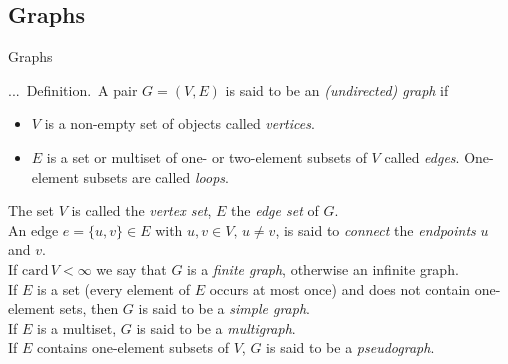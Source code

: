 \documentclass[smaller,hyperref={CJKbookmarks=true}]{beamer}
\newcounter{zhuo}[subsection]
\renewcommand{\thezhuo}{\thesection.\thesubsection.\arabic{zhuo}}
\newenvironment{DEFINITION}{\stepcounter{zhuo}\alert{\thezhuo.~Definition.\,}}{}
\begin{document}
\subsection{Graphs}
\begin{frame}[c] \begin{spacing}{2.5}
\tableofcontents[sectionstyle=hide,subsectionstyle=show/shaded/hide] \end{spacing}
\end{frame}
\begin{frame}[t]{Graphs}
\begin{spacing}{1.1}
\begin{DEFINITION}
A pair $G=(V,E)$ is said to be an \emph{(undirected) graph} if
\begin{itemize}
  \item $V$ is a non-empty set of objects called \emph{vertices}.
  \item $E$ is a set or multiset of one- or two-element subsets of $V$ called \emph{edges}. One-element subsets are called \emph{loops}.
\end{itemize}
The set $V$ is called the \emph{vertex set}, $E$ the \emph{edge set} of $G$.\\[5pt]
An edge $e=\{u,v\}\in E$ with $u,v\in V,\,u\neq v$, is said to \emph{connect} the \emph{endpoints} $u$ and $v$.\\[5pt]
If $\text{card}\,V<\infty$ we say that $G$ is a \emph{finite graph}, otherwise an infinite graph.\\[5pt]
If $E$ is a set (every element of $E$ occurs at most once) and does not contain one-element sets, then $G$ is said to be a \emph{simple graph}.\\[5pt]
If $E$ is a multiset, $G$ is said to be a \emph{multigraph}.\\[5pt]
If $E$ contains one-element subsets of $V$, $G$ is said to be a \emph{pseudograph}.
\end{DEFINITION}
\end{spacing}
\end{frame}
\end{document}
